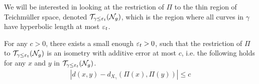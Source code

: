 \documentclass[12pt, reqno]{amsart}
\begin{document}
We will be interested in looking at the restriction of $\Pi$ to the thin region of Teichmüller space, denoted $\mathcal{T}_{\gamma \leq \varepsilon_t}(\mathcal{N}_g)$, which is the region where all curves in $\gamma$ have hyperbolic length at most $\varepsilon_t$.

\begin{theorem}
  \label{thm:prno}
  For any $c >0$, there exists a small enough $\varepsilon_t > 0$, such that the restriction of $\Pi$ to $\mathcal{T}_{\gamma \leq \varepsilon_t}(\mathcal{N}_g)$ is an isometry with additive error at most $c$, i.e. the following holds for any $x$ and $y$ in $\mathcal{T}_{\gamma \leq \varepsilon_t}(\mathcal{N}_g)$.
  \begin{align*}
    \left| d(x, y) - d_{X_{\gamma}}(\Pi(x), \Pi(y)) \right| \leq c
  \end{align*}
\end{theorem}
\end{document}
